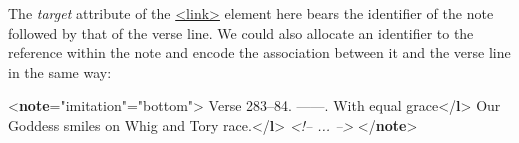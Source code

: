 The {\itshape target} attribute of the \hyperref[TEI.link]{<link>} element here bears the identifier of the note followed by that of the verse line. We could also allocate an identifier to the reference within the note and encode the association between it and the verse line in the same way: \par\bgroup{}\exampleFont \begin{shaded}\noindent\mbox{}{<\textbf{note}\hspace*{1em}{type}="{imitation}"\hspace*{1em}{place}="{bottom}">}\mbox{}\newline 
{}Verse 283–84.\mbox{}\newline 
{}\mbox{}\newline 
\hspace*{1em}\hspace*{1em}——. With equal grace{</\textbf{l}>}\mbox{}\newline 
\hspace*{1em}\hspace*{1em}Our Goddess smiles on Whig and Tory race.{</\textbf{l}>}\mbox{}\newline 
\hspace*{1em}\mbox{}\newline 
{}\mbox{}\newline 
\textit{<!-- ... -->}\mbox{}\newline 
{</\textbf{note}>}\mbox{}\newline 

\end{shaded}
